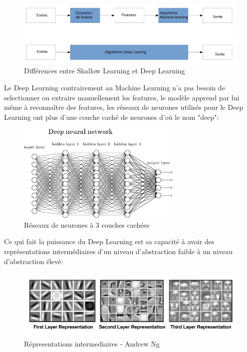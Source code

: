 \begin{figure}[H]
    \centering
    \includegraphics[width=1\textwidth]{Images/MLvsDL}
    \caption{Différences entre Shallow Learning et Deep Learning}
	\label{fig:DiffMLDL}
\end{figure}

Le Deep Learning contrairement au Machine Learning n'a pas besoin de selectionner
ou extraire manuellement les features, le modèle apprend par lui même à reconnaître
des features, les réseaux de neurones utilisés pour le Deep Learning
ont plus d'une couche caché de neurones d'où le nom "deep": \newline

\begin{figure}[H]
    \centering
    \includegraphics[width=0.7\textwidth]{Images/deepnn}
    \caption{Réseaux de neurones à 3 couches cachées}
	\label{fig:deepneuralnetwork}
\end{figure}

Ce qui fait la puissance du Deep Learning est sa capacité à avoir des représentations
intermédiaires d'un niveau d'abstraction faible à un niveau d'abstraction élevé:

\begin{figure}[H]
    \centering
    \includegraphics[width=1\textwidth]{Images/layeredrepresentation}
    \caption{Répresentations intermediaires - Andrew Ng}
	\label{fig:deepnnrepresentation}
\end{figure}


